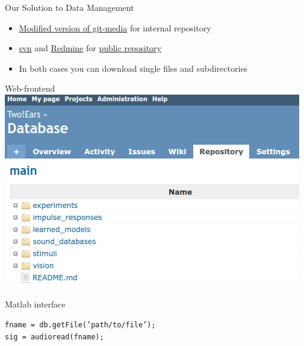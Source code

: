 \documentclass{beamer}
\begin{document}
\begin{frame}[fragile]{Our Solution to Data Management}

    \begin{itemize}
        \item \href{https://github.com/TWOEARS/git-media}{Modified version
            of git-media} for internal repository \\
        \item \href{https://subversion.apache.org}{svn} and
            \href{http://www.redmine.org}{Redmine} for
            \href{https://dev.qu.tu-berlin.de/projects/twoears-getdata/repository}{public
            repository}
        \item In both cases you can download single files and subdirectories
    \end{itemize}

    \vspace{0.8cm}

    \begin{minipage}[t]{.4\columnwidth}
        \centering
        Web-frontend \\
        \vspace{0.2cm}
        \includegraphics[width=.9\textwidth]{fig/redmine}
    \end{minipage}
    \hfill
    \begin{minipage}[t]{.59\columnwidth}
        \begin{center}
            Matlab interface \\
        \end{center}
        \vspace{0.2cm}
        \small
        \texttt{fname = db.getFile('path/to/file');} \\
        \texttt{sig = audioread(fname);}

        \vspace{1cm}

    \end{minipage}

\end{frame}
\end{document}
